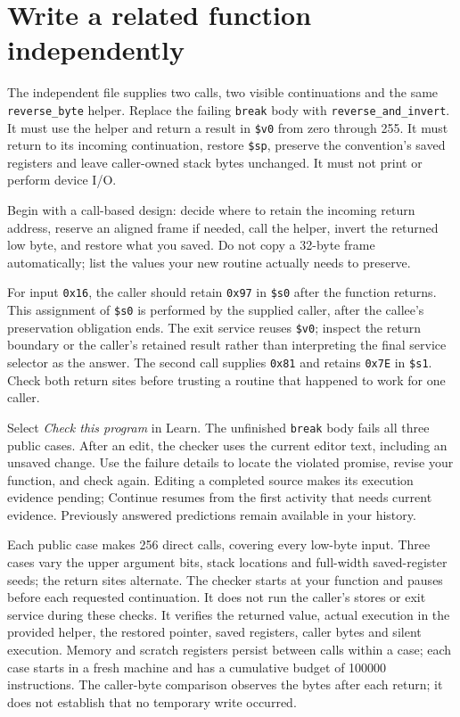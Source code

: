 \section{Write a related function independently}

The independent file supplies two calls, two visible continuations and the same
\texttt{reverse\_byte} helper. Replace the failing \texttt{break} body with
\texttt{reverse\_and\_invert}. It must use the helper and return a result in
\texttt{\$v0} from zero through 255. It must return to its incoming continuation,
restore \texttt{\$sp}, preserve the convention's saved registers and leave
caller-owned stack bytes unchanged. It must not print or perform device I/O.

Begin with a call-based design: decide where to retain the incoming return
address, reserve an aligned frame if needed, call the helper, invert the returned
low byte, and restore what you saved. Do not copy a 32-byte frame automatically;
list the values your new routine actually needs to preserve.

For input \texttt{0x16}, the caller should retain \texttt{0x97} in
\texttt{\$s0} after the function returns. This assignment of \texttt{\$s0} is
performed by the supplied caller, after the callee's preservation obligation ends.
The exit service reuses \texttt{\$v0}; inspect the return boundary or the caller's
retained result rather than interpreting the final service selector as the answer.
The second call supplies \texttt{0x81} and retains \texttt{0x7E} in
\texttt{\$s1}. Check both return sites before trusting a routine that happened
to work for one caller.

Select \emph{Check this program} in Learn. The unfinished \texttt{break} body
fails all three public cases. After an edit, the checker uses the current editor
text, including an unsaved change. Use the failure details to locate the violated
promise, revise your function, and check again. Editing a completed source makes
its execution evidence pending; Continue resumes from the first activity that
needs current evidence. Previously answered predictions remain available in your
history.

Each public case makes 256 direct calls, covering every low-byte input. Three
cases vary the upper argument bits, stack locations and full-width saved-register
seeds; the return sites alternate. The checker starts at your function and pauses
before each requested continuation. It does not run the caller's stores or exit
service during these checks. It verifies the returned value, actual execution in
the provided helper, the restored pointer, saved registers, caller bytes and
silent execution. Memory and scratch registers persist between calls within a
case; each case starts in a fresh machine and has a cumulative budget of 100000
instructions. The caller-byte comparison observes the bytes after each return;
it does not establish that no temporary write occurred.

